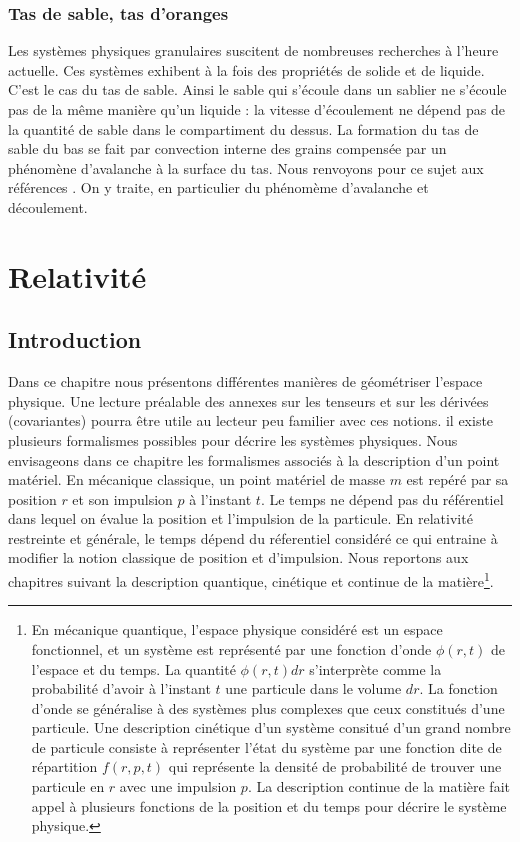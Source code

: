 \documentclass[12pt]{book}
\begin{document}
\subsection{Tas de sable, tas d'oranges}
Les syst\`emes physiques granulaires suscitent de nombreuses recherches
\`a l'heure actuelle. Ces syst\`emes exhibent \`a la fois des
propri\'et\'es de solide et de liquide. C'est le cas du tas de sable.
Ainsi le
sable qui s'\'ecoule dans un sablier ne s'\'ecoule pas de la m\^eme
mani\`ere qu'un liquide : la vitesse d'\'ecoulement ne d\'epend pas de
la quantit\'e de sable dans le compartiment du dessus. La formation
du tas de sable du bas se fait par convection interne des grains
compens\'ee par un ph\'enom\`ene d'avalanche \`a la surface du tas.
Nous renvoyons pour ce sujet aux r\'ef\'erences \cite{ph:granu:Guyon94}. On y
traite, en particulier du ph\'enom\`eme d'avalanche et d\'ecoulement. 


\chapter{Relativit\'e}\label{chaprelat}
\section{Introduction}
Dans ce chapitre nous pr\'esentons diff\'erentes mani\`eres de g\'eom\'etriser
l'espace physique. Une lecture pr\'ealable des annexes sur les tenseurs et sur
les d\'eriv\'ees (covariantes) pourra \^etre utile au lecteur peu familier
avec ces notions.
il existe plusieurs formalismes possibles pour d\'ecrire les syst\`emes
physiques. Nous envisageons dans ce chapitre les formalismes associ\'es \`a la
description d'un point mat\'eriel.
En m\'ecanique classique, un point mat\'eriel de masse $m$ est rep\'er\'e par
sa position $r$ et son impulsion $p$ \`a l'instant $t$. Le temps ne d\'epend
pas du r\'ef\'erentiel dans lequel on \'evalue la position et l'impulsion de
la particule. En relativit\'e
restreinte et g\'en\'erale, le temps d\'epend du r\'eferentiel consid\'er\'e
ce qui entraine \`a modifier la notion classique de position et d'impulsion.
Nous reportons aux chapitres suivant la description quantique, cin\'etique et
continue de la mati\`ere\footnote{%
En m\'ecanique quantique, l'espace physique consid\'er\'e est un espace
fonctionnel, et un 
syst\`eme est repr\'esent\'e par une fonction d'onde $\phi(r,t)$ de l'espace
et du 
temps. La quantit\'e $\phi(r,t)dr$  s'interpr\`ete comme la
probabilit\'e d'avoir \`a l'instant $t$ une particule dans le volume
$dr$.
La fonction d'onde se g\'en\'eralise \`a des syst\`emes plus complexes
que ceux constitu\'es d'une particule.
Une description cin\'etique d'un syst\`eme consitu\'e d'un grand nombre de
particule consiste \`a repr\'esenter l'\'etat du syst\`eme par une fonction
dite de r\'epartition $f(r,p,t)$ qui repr\'esente la densit\'e de
probabilit\'e de trouver une particule en $r$ avec une impulsion $p$.
La description continue de la mati\`ere fait appel \`a plusieurs fonctions de
la position et du temps pour d\'ecrire le syst\`eme physique.}.%
\end{document}
